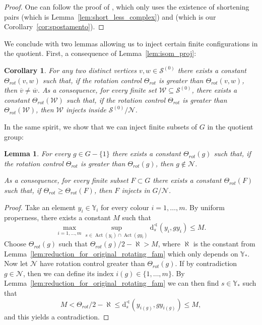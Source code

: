 \documentclass[svgnames]{amsart}
\theoremstyle{plain}
\newtheorem{lemma}[thm]{Lemma}
\newtheorem{cor}[thm]{Corollary}
\theoremstyle{definition}
\newcommand{\ov}[1]{\overline{#1}}
\newcommand{\dist}{\mathrm{d}}
\newcommand{\Act}{\operatorname{Act}}
\newcommand{\N}{\mathcal{N}}
\newcommand{\calS}{\mathcal{S}}
\renewcommand{\angle}{\sphericalangle}
\begin{document}
\begin{proof}
    One can follow the proof of \cite[Proposition 4.8]{dfdt}, which only uses the existence of shortening pairs (which is Lemma~\ref{lem:short_less_complex}) and \cite[Corollary 1.8]{dfdt} (which is our Corollary~\ref{cor:spostamento}).
\end{proof}

We conclude with two lemmas allowing us to inject certain finite configurations in the quotient. First, a consequence of Lemma~\ref{lem:isom_proj}:
\begin{cor}\label{lem:finite_vertices_inject}
    For any two distinct vertices $v,w\in\calS^{(0)}$ there exists a constant $\Theta_{rot}(v,w)$ such that, if the rotation control $\Theta_{rot}$ is greater than $\Theta_{rot}(v,w)$, then $\ov v\neq \ov w$.  As a consequence, for every finite set $\mathcal{W}\subseteq \calS^{(0)}$, there exists a constant $\Theta_{rot}(\mathcal W)$ such that, if the rotation control $\Theta_{rot}$ is greater than $\Theta_{rot}(\mathcal W)$, then $\mathcal{W}$ injects inside $\calS^{(0)}/\N$.
\end{cor}

In the same spirit, we show that we can inject finite subsets of $G$ in the quotient group:

\begin{lemma}\label{lem:separating_rotating_fam}
    For every $g\in G-\{1\}$ there exists a constant $\Theta_{rot}(g)$ such that, if the rotation control $\Theta_{rot}$ is greater than $\Theta_{rot}(g)$, then $g\not\in\N$. 

    As a consequence, for every finite subset $F\subset G$ there exists a constant $\Theta_{rot}(F)$ such that, if $\Theta_{rot}\ge\Theta_{rot}(F)$, then $F$ injects in $G/\N$.
\end{lemma}

\begin{proof}
    Take an element $y_i\in\mathbb{Y}_i$ for every colour $i=1,\ldots,m$. By uniform properness, there exists a constant $M$ such that
$$\max_{i=1,\ldots,m}\sup_{s\in\Act(y_i)\cap\Act(g y_i)} \dist^\angle_s(y_i,g y_i)\le M.$$
Choose $\Theta_{rot}(g)$ such that $\Theta_{rot}(g)/2-\aleph> M$, where $\aleph$ is the constant from Lemma~\ref{lem:reduction_for_original_rotating_fam} which only depends on $\mathbb{Y}_*$. Now let $\N$ have rotation control greater than $\Theta_{rot}(g)$. If by contradiction $g\in \N$, then we can define its index $i(g)\in\{1,\ldots,m\}$. By Lemma~\ref{lem:reduction_for_original_rotating_fam} we can then find $s\in \mathbb{Y}_*$ such that
$$M<\Theta_{rot}/2-\aleph\le \dist^\angle_s(y_{i(g)}, g y_{i(g)})\le M,$$
and this yields a contradiction.
\end{proof}
\end{document}
